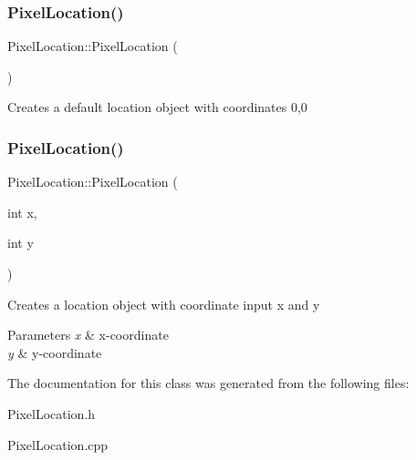 \subsubsection{\texorpdfstring{Pixel\+Location()}{PixelLocation()}\hspace{0.1cm}{\footnotesize\ttfamily [1/2]}}
{\footnotesize\ttfamily Pixel\+Location\+::\+Pixel\+Location (\begin{DoxyParamCaption}{ }\end{DoxyParamCaption})}

Creates a default location object with coordinates 0,0 \mbox{\label{class_pixel_location_a4229aa113847e419bb8427bfb37a55cf}} 
\subsubsection{\texorpdfstring{Pixel\+Location()}{PixelLocation()}\hspace{0.1cm}{\footnotesize\ttfamily [2/2]}}
{\footnotesize\ttfamily Pixel\+Location\+::\+Pixel\+Location (\begin{DoxyParamCaption}\item[{int}]{x,  }\item[{int}]{y }\end{DoxyParamCaption})}

Creates a location object with coordinate input x and y


\begin{DoxyParams}{Parameters}
{\em x} & x-\/coordinate \\
\hline
{\em y} & y-\/coordinate \\
\hline
\end{DoxyParams}


The documentation for this class was generated from the following files\+:\begin{DoxyCompactItemize}
\item 
Pixel\+Location.\+h\item 
Pixel\+Location.\+cpp\end{DoxyCompactItemize}
